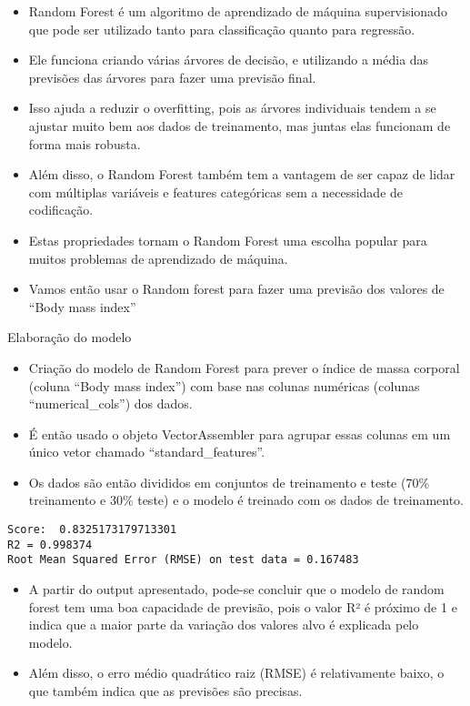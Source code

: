 \documentclass[11pt]{article}
\providecommand{\tightlist}{%
      \setlength{\itemsep}{0pt}\setlength{\parskip}{0pt}}
\begin{document}
    \begin{itemize}
\tightlist
\item
  Random Forest é um algoritmo de aprendizado de máquina supervisionado
  que pode ser utilizado tanto para classificação quanto para regressão.
\item
  Ele funciona criando várias árvores de decisão, e utilizando a média
  das previsões das árvores para fazer uma previsão final.
\item
  Isso ajuda a reduzir o overfitting, pois as árvores individuais tendem
  a se ajustar muito bem aos dados de treinamento, mas juntas elas
  funcionam de forma mais robusta.
\item
  Além disso, o Random Forest também tem a vantagem de ser capaz de
  lidar com múltiplas variáveis e features categóricas sem a necessidade
  de codificação.
\item
  Estas propriedades tornam o Random Forest uma escolha popular para
  muitos problemas de aprendizado de máquina.
\item
  Vamos então usar o Random forest para fazer uma previsão dos valores
  de ``Body mass index''
\end{itemize}
Elaboração do modelo
    \begin{itemize}
\tightlist
\item
  Criação do modelo de Random Forest para prever o índice de massa
  corporal (coluna ``Body mass index'') com base nas colunas numéricas
  (colunas ``numerical\_cols'') dos dados.
\item
  É então usado o objeto VectorAssembler para agrupar essas colunas em
  um único vetor chamado ``standard\_features''.
\item
  Os dados são então divididos em conjuntos de treinamento e teste (70\%
  treinamento e 30\% teste) e o modelo é treinado com os dados de
  treinamento.
\end{itemize}

    \begin{Verbatim}[commandchars=\\\{\}]
Score:  0.8325173179713301
R2 = 0.998374
Root Mean Squared Error (RMSE) on test data = 0.167483
    \end{Verbatim}

    \begin{itemize}
\tightlist
\item
  A partir do output apresentado, pode-se concluir que o modelo de
  random forest tem uma boa capacidade de previsão, pois o valor R² é
  próximo de 1 e indica que a maior parte da variação dos valores alvo é
  explicada pelo modelo.
\item
  Além disso, o erro médio quadrático raiz (RMSE) é relativamente baixo,
  o que também indica que as previsões são precisas.
\end{itemize}
\end{document}
